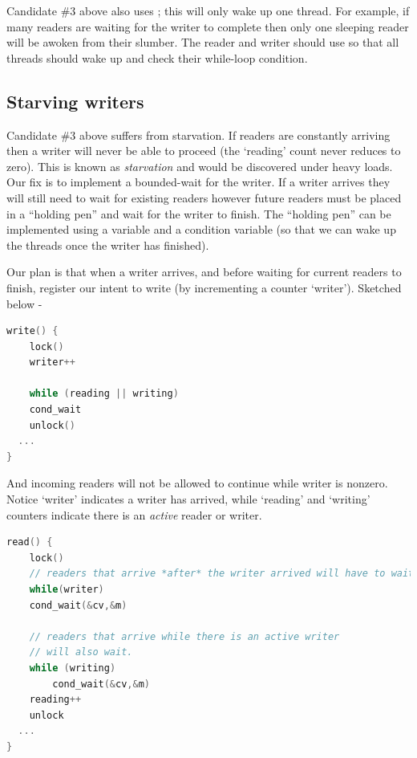 Candidate \#3 above also uses  ; this will only wake up one thread. For example, if many readers are waiting for the writer to complete then only one sleeping reader will be awoken from their slumber. The reader and writer should use  so that all threads should wake up and check their while-loop condition.

\subsection{Starving writers}\label{starving-writers}

Candidate \#3 above suffers from starvation. If readers are constantly arriving then a writer will never be able to proceed (the `reading' count never reduces to zero). This is known as \emph{starvation} and would be discovered under heavy loads. Our fix is to implement a bounded-wait for the writer. If a writer arrives they will still need to wait for existing readers however future readers must be placed in a ``holding pen'' and wait for the writer to finish. The ``holding pen'' can be implemented using a variable and a condition variable (so that we can wake up the threads once the writer has finished).

Our plan is that when a writer arrives, and before waiting for current readers to finish, register our intent to write (by incrementing a counter `writer'). Sketched below -

\begin{lstlisting}[language=C]
write() {
    lock()
    writer++

    while (reading || writing)
    cond_wait
    unlock()
  ...
}
\end{lstlisting}

And incoming readers will not be allowed to continue while writer is nonzero. Notice `writer' indicates a writer has arrived, while `reading' and `writing' counters indicate there is an \emph{active} reader or writer.

\begin{lstlisting}[language=C]
read() {
    lock()
    // readers that arrive *after* the writer arrived will have to wait here!
    while(writer)
    cond_wait(&cv,&m)

    // readers that arrive while there is an active writer
    // will also wait.
    while (writing) 
        cond_wait(&cv,&m)
    reading++
    unlock
  ...
}
\end{lstlisting}

